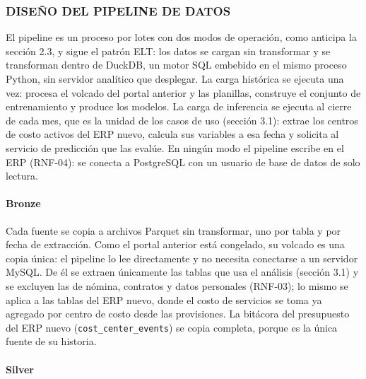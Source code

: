\subsubsection{DISEÑO DEL PIPELINE DE DATOS}

El pipeline es un proceso por lotes con dos modos de operación, como anticipa la sección 2.3, y sigue el patrón ELT: los datos se cargan sin transformar y se transforman dentro de DuckDB, un motor SQL embebido en el mismo proceso Python, sin servidor analítico que desplegar. La carga histórica se ejecuta una vez: procesa el volcado del portal anterior y las planillas, construye el conjunto de entrenamiento y produce los modelos. La carga de inferencia se ejecuta al cierre de cada mes, que es la unidad de los casos de uso (sección 3.1): extrae los centros de costo activos del ERP nuevo, calcula sus variables a esa fecha y solicita al servicio de predicción que las evalúe. En ningún modo el pipeline escribe en el ERP (RNF-04): se conecta a PostgreSQL con un usuario de base de datos de solo lectura.

\paragraph{Bronze}

Cada fuente se copia a archivos Parquet sin transformar, uno por tabla y por fecha de extracción. Como el portal anterior está congelado, su volcado es una copia única: el pipeline lo lee directamente y no necesita conectarse a un servidor MySQL\@. De él se extraen únicamente las tablas que usa el análisis (sección 3.1) y se excluyen las de nómina, contratos y datos personales (RNF-03); lo mismo se aplica a las tablas del ERP nuevo, donde el costo de servicios se toma ya agregado por centro de costo desde las provisiones. La bitácora del presupuesto del ERP nuevo (\texttt{cost\_center\_events}) se copia completa, porque es la única fuente de su historia.

\paragraph{Silver}

